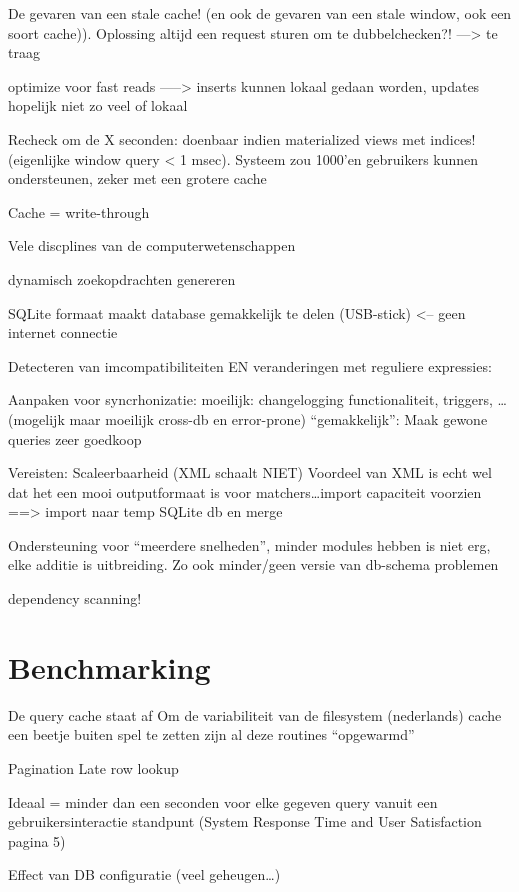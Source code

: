 De gevaren van een stale cache! (en ook de gevaren van een stale window, ook
een soort cache)). Oplossing altijd een request sturen om te dubbelchecken?!
---> te traag

optimize voor fast reads -----> inserts kunnen lokaal gedaan worden, updates hopelijk niet zo veel of lokaal

Recheck om de X seconden: doenbaar indien materialized views met indices!
(eigenlijke window query < 1 msec). Systeem zou 1000'en gebruikers kunnen
ondersteunen, zeker met een grotere cache

Cache = write-through

Vele discplines van de computerwetenschappen


dynamisch zoekopdrachten genereren

SQLite formaat maakt database gemakkelijk te delen (USB-stick) <-- geen internet
connectie

Detecteren van imcompatibiliteiten EN veranderingen met reguliere
expressies:

Aanpaken voor syncrhonizatie:
moeilijk: changelogging functionaliteit, triggers, \ldots (mogelijk maar
moeilijk cross-db en error-prone)
``gemakkelijk'': Maak gewone queries zeer goedkoop

Vereisten: Scaleerbaarheid (XML schaalt NIET)
Voordeel van XML is echt wel dat het een mooi outputformaat is voor
matchers\ldots import capaciteit voorzien ==> import naar temp SQLite db en
merge

Ondersteuning voor ``meerdere snelheden'', minder modules hebben is niet erg,
elke additie is uitbreiding. Zo ook minder/geen versie van db-schema problemen

dependency scanning!

\section{Benchmarking}
De query cache staat af
Om de variabiliteit van de filesystem (nederlands) cache een beetje buiten spel te zetten zijn al deze routines ``opgewarmd''

Pagination
Late row lookup

Ideaal = minder dan een seconden voor elke gegeven query vanuit een gebruikersinteractie standpunt (System Response Time and User Satisfaction pagina 5)

Effect van DB configuratie (veel geheugen\ldots)

